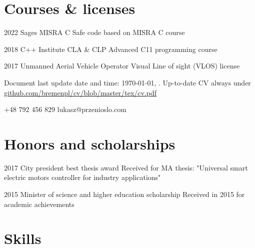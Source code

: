 \documentclass{tccv}
\begin{document}
\section{Courses \& licenses}

\begin{yearlist}

\item{2022}
     {Sages MISRA C}
     {Safe code based on MISRA C course}

\item{2018}
     {C++ Institute CLA \& CLP}
     {Advanced C11 programming course}

\item{2017}
     {Unmanned Aerial Vehicle Operator}
     {Visual Line of sight (VLOS) license}

\end{yearlist}

\vspace*{\fill} %

{\scriptsize Document last update date and time: \today, \currenttime. Up-to-date CV always under  \href{https://github.com/bremenpl/cv/blob/master/tex/cv.pdf}{github.com/bremenpl/cv/blob/master/tex/cv.pdf}}

    {+48 792 456 829}
    {lukasz@przenioslo.com}
    
\section{Honors and scholarships}

\begin{yearlist}

\item{2017}
     {City president best thesis award}
     {Received for MA thesis: "Universal smart electric motors controller for industry applications"} 
     
\item{2015}
     {Minister of science and higher education scholarship}
     {Received in 2015 for academic achievements} 
    
\end{yearlist}

\section{Skills}
\end{document}
